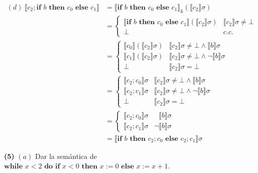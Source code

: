 \documentclass[a4paper, 12pt]{article}
\begin{document}
~

\begin{align*}
  (d) ~ \llbracket c_2;\textbf{if } b \textbf{ then } c_0 \textbf{ else } c_1 \rrbracket 
  &= \llbracket \textbf{if } b \textbf{ then } c_0 \textbf{ else } c_1
  \rrbracket_{\Bot} \left( \llbracket c_2 \rrbracket \sigma \right)  \\ 
  &= \begin{cases}
    \llbracket \textbf{if } b \textbf{ then } c_0 \textbf{ else } c_1 \rrbracket
    \left( \llbracket c_2 \rrbracket \sigma\right) & \llbracket c_2 \rrbracket
    \sigma \neq \bot  \\ 
    \bot & c.c.
  \end{cases} \\ 
  &= \begin{cases}
    \llbracket c_0 \rrbracket \left( \llbracket c_2 \rrbracket \sigma \right) &
    \llbracket c_2 \rrbracket \sigma \neq \bot \land \llbracket b \rrbracket
    \sigma \\
    \llbracket c_1 \rrbracket \left( \llbracket c_2 \rrbracket \sigma \right) &
    \llbracket c_2 \rrbracket \sigma \neq \bot \land \neg \llbracket b
    \rrbracket \sigma \\ 
    \bot  & \llbracket c_2 \rrbracket\sigma = \bot 
  \end{cases} \\ 
  &= \begin{cases}
    \llbracket c_2;c_0 \rrbracket \sigma &
    \llbracket c_2 \rrbracket \sigma \neq \bot \land \llbracket b \rrbracket
    \sigma \\
    \llbracket c_2;c_1 \rrbracket \sigma &
    \llbracket c_2 \rrbracket \sigma \neq \bot \land \neg \llbracket b
    \rrbracket \sigma \\ 
    \bot  & \llbracket c_2 \rrbracket\sigma = \bot 
  \end{cases} \\ 
  &=\begin{cases}
    \llbracket c_2;c_0 \rrbracket \sigma & ~~~\llbracket b \rrbracket \sigma \\ 
    \llbracket c_2;c_1 \rrbracket \sigma & \neg \llbracket b \rrbracket \sigma
  \end{cases} \\ 
  &= \llbracket \textbf{if } b \textbf{ then } c_2;c_0 \textbf{ else } c_2;c_1
  \rrbracket \sigma
\end{align*}

\pagebreak 

\begin{myframe}
\textbf{(5)} $(a)$ Dar la semántica de $\textbf{while } x < 2 \textbf{ do }  \textbf{if } x <
0\textbf{ then } x := 0 \textbf{ else } x := x + 1$. 
\end{myframe}
\end{document}
